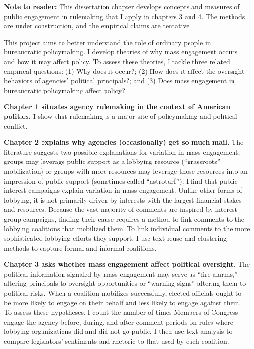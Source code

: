 \documentclass[
      12pt,
        ]{article}
\begin{document}







  \newpage

\noindent 
 
   
    \onehalfspacing 
   
   
\textbf{Note to reader:} This dissertation chapter develops concepts and measures of public engagement in rulemaking that I apply in chapters 3 and 4. The methods are under construction, and the empirical claims are tentative.

This project aims to better understand the role of ordinary people in bureaucratic policymaking.
I develop theories of why mass engagement occurs and how it may affect policy. To assess these theories, I tackle three related empirical questions: (1) Why does it occur?; (2) How does it affect the oversight behaviors of agencies' political principals?; and
(3) Does mass engagement in bureaucratic policymaking affect policy?

\textbf{Chapter 1 situates agency rulemaking in the context of American politics.} I show that rulemaking is a major site of policymaking and political conflict.

\textbf{Chapter 2 explains why agencies (occasionally) get so much mail.}
The literature suggests two possible explanations for variation in mass engagement; groups may leverage public support as a lobbying resource (``grassroots'' mobilization) or groups with more resources may leverage those resources into an impression of public support (sometimes called ``astroturf'').
I find that public interest campaigns explain variation in mass engagement. Unlike other forms of lobbying, it is not primarily driven by interests with the largest financial stakes and resources.
Because the vast majority of comments are inspired by interest-group campaigns, finding their cause requires a method to link comments to the lobbying coalitions that mobilized them. To link individual comments to the more sophisticated lobbying efforts they support, I use text reuse and clustering methods to capture formal and informal coalitions.

\textbf{Chapter 3 asks whether mass engagement affect political oversight.} The political information signaled by mass engagement may serve as ``fire alarms,'' altering principals to oversight opportunities or ``warning signs'' altering them to political risks.
When a coalition mobilizes successfully,
elected officials ought to be more likely to engage on their behalf and less likely to engage against them.
To assess these hypotheses, I count the number of times Members of Congress engage the agency before, during, and after comment periods on rules where lobbying organizations did and did not go public. I then use text analysis to compare legislators' sentiments and rhetoric to that used by each coalition.
\end{document}

